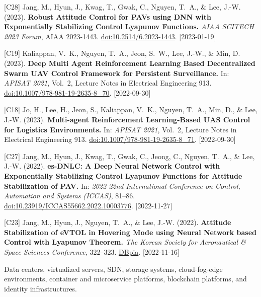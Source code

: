 {\begin{pubenumerate}
\item {\color{green}[C28]} Jang, M., Hyun, J., Kwag, T., Gwak, C., Nguyen, T.\ A., \& Lee, J.-W. (2023). \textbf{Robust Attitude Control for PAVs using DNN with Exponentially Stabilizing Control Lyapunov Functions.} \textit{AIAA SCITECH 2023 Forum}, AIAA 2023-1443. \href{https://doi.org/10.2514/6.2023-1443}{doi:10.2514/6.2023-1443}. [2023-01-19]

\item {\color{green}[C19]} Kaliappan, V.\ K., Nguyen, T.\ A., Jeon, S.\ W., Lee, J.-W., \& Min, D. (2023). \textbf{Deep Multi Agent Reinforcement Learning Based Decentralized Swarm UAV Control Framework for Persistent Surveillance.} In: \textit{APISAT 2021}, Vol.\ 2, Lecture Notes in Electrical Engineering 913. \href{https://doi.org/10.1007/978-981-19-2635-8_70}{doi:10.1007/978-981-19-2635-8\_70}. [2022-09-30]

\item {\color{green}[C18]} Jo, H., Lee, H., Jeon, S., Kaliappan, V.\ K., Nguyen, T.\ A., Min, D., \& Lee, J.-W. (2023). \textbf{Multi-agent Reinforcement Learning-Based UAS Control for Logistics Environments.} In: \textit{APISAT 2021}, Vol.\ 2, Lecture Notes in Electrical Engineering 913. \href{https://doi.org/10.1007/978-981-19-2635-8_71}{doi:10.1007/978-981-19-2635-8\_71}. [2022-09-30]

\item {\color{green}[C27]} Jang, M., Hyun, J., Kwag, T., Gwak, C., Jeong, C., Nguyen, T.\ A., \& Lee, J.-W. (2022). \textbf{es-DNLC: A Deep Neural Network Control with Exponentially Stabilizing Control Lyapunov Functions for Attitude Stabilization of PAV.} In: \textit{2022 22nd International Conference on Control, Automation and Systems (ICCAS)}, 81--86. \href{https://doi.org/10.23919/ICCAS55662.2022.10003776}{doi:10.23919/ICCAS55662.2022.10003776}. [2022-11-27]

\item {\color{green}[C23]} Jang, M., Hyun, J., Nguyen, T.\ A., \& Lee, J.-W. (2022). \textbf{Attitude Stabilization of eVTOL in Hovering Mode using Neural Network based Control with Lyapunov Theorem.} \textit{The Korean Society for Aeronautical \& Space Sciences Conference}, 322--323. \href{https://www.dbpia.co.kr/journal/articleDetail?nodeId=NODE11076828}{DBpia}. [2022-11-16]

\end{pubenumerate}


Data centers, virtualized servers, SDN, storage systems, cloud-fog-edge environments, container and microservice platforms, blockchain platforms, and identity infrastructures.

}
